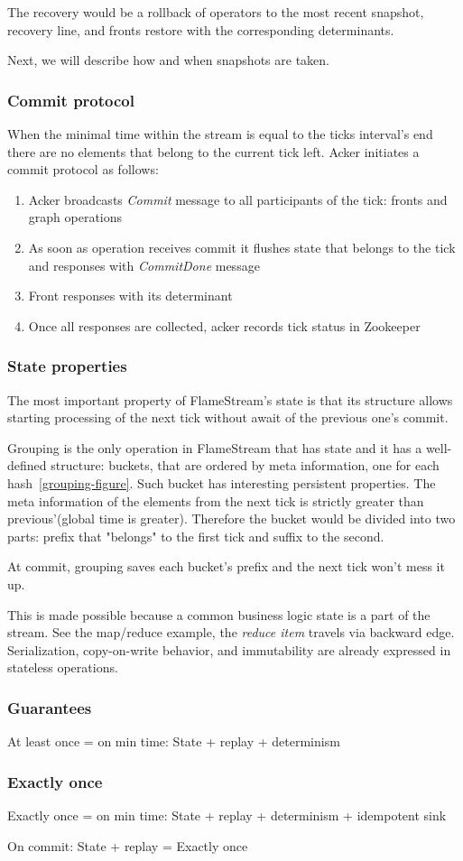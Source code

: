 The recovery would be a rollback of operators to the most recent snapshot, recovery line, and fronts restore with the corresponding determinants.

Next, we will describe how and when snapshots are taken.

\subsubsection{Commit protocol}
When the minimal time within the stream is equal to the ticks interval's end there are no elements that belong to the current tick left. Acker initiates a commit protocol as follows: 

\begin{enumerate}
\item{Acker broadcasts {\it Commit} message to all participants of the tick: fronts and graph operations}
\item{As soon as operation receives commit it flushes state that belongs to the tick and responses with {\it CommitDone} message}
\item{Front responses with its determinant} 
\item{Once all responses are collected, acker records tick status in Zookeeper}
\end{enumerate}

\subsubsection{State properties}
The most important property of FlameStream's state is that its structure allows starting processing of the next tick without await of the previous one's commit. 

Grouping is the only operation in FlameStream that has state and it has a well-defined structure: buckets, that are ordered by meta information, one for each hash~\ref{grouping-figure}. Such bucket has interesting persistent properties. The meta information of the elements from the next tick is strictly greater than previous'(global time is greater). Therefore the bucket would be divided into two parts: prefix that "belongs" to the first tick and suffix to the second.

At commit, grouping saves each bucket's prefix and the next tick won't mess it up.

This is made possible because a common business logic state is a part of the stream. See the map/reduce example, the {\it reduce item} travels via backward edge. Serialization, copy-on-write behavior, and immutability are already expressed in stateless operations.

\subsubsection{Guarantees}
At least once = on min time: State + replay + determinism

\subsubsection{Exactly once}
Exactly once = on min time: State + replay + determinism + idempotent sink

On commit: State + replay = Exactly once

